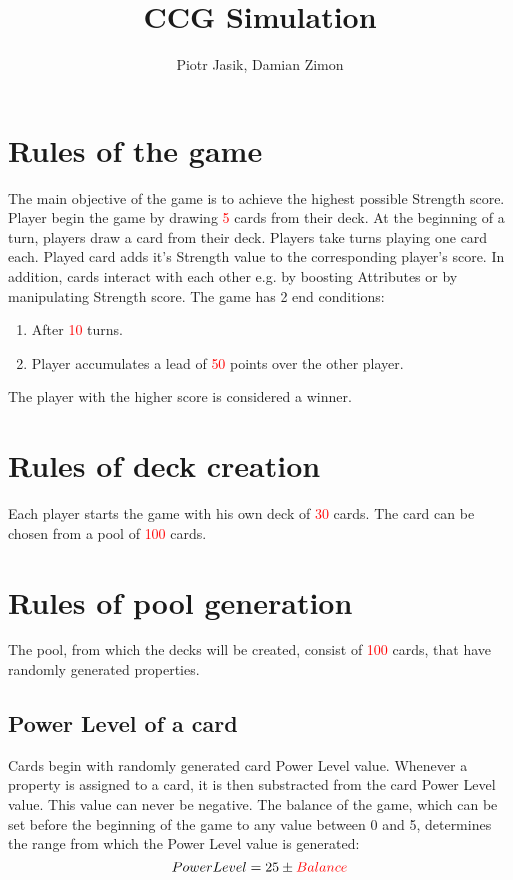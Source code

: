 \documentclass{article}
\title{CCG Simulation}
\author{Piotr Jasik, Damian Zimon}
\begin{document}
\maketitle
\section{Rules of the game}
    The main objective of the game is to achieve the highest possible Strength score. 
    Player begin the game by drawing \textcolor{red}{5} cards from their deck.
    At the beginning of a turn, players draw a card from their deck.
    Players take turns playing one card each.
    Played card adds it's Strength value to the corresponding player's score. 
    In addition, cards interact with each other e.g. by boosting Attributes or by manipulating Strength score. 
    The game has 2 end conditions: 
    \begin{enumerate}
        \item After \textcolor{red}{10} turns.
        \item Player accumulates a lead of \textcolor{red}{50} points over the other player.
    \end{enumerate}
    The player with the higher score is considered a winner.
\section{Rules of deck creation}
    Each player starts the game with his own deck of \textcolor{red}{30} cards. 
    The card can be chosen from a pool of \textcolor{red}{100} cards.
\section{Rules of pool generation}
    The pool, from which the decks will be created, consist of \textcolor{red}{100} cards, 
    that have randomly generated properties.
\subsection{Power Level of a card}
    Cards begin with randomly generated card Power Level value.  Whenever a property 
    is assigned to a card, it is then substracted from the card Power Level value. 
    This value can never be negative. The balance of the game, which can be set before 
    the beginning of the game to any value between 0 and 5, determines the range 
    from which the Power Level value is generated:
    \begin{equation}
        Power Level = 25\pm \textcolor{red}{Balance}
    \end{equation}\\
\end{document}
